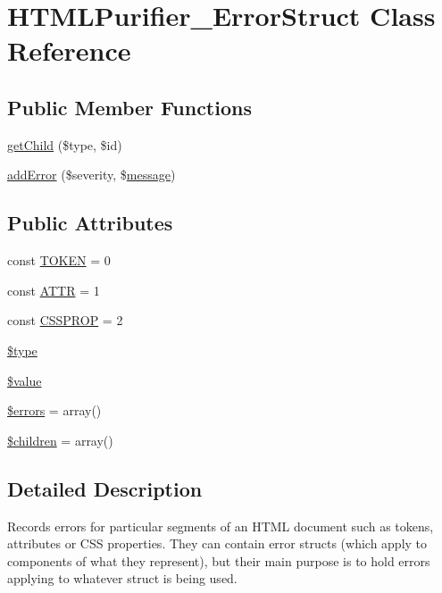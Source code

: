 \hypertarget{classHTMLPurifier__ErrorStruct}{\section{H\+T\+M\+L\+Purifier\+\_\+\+Error\+Struct Class Reference}
\label{classHTMLPurifier__ErrorStruct}
}
\subsection*{Public Member Functions}
\begin{DoxyCompactItemize}
\item 
\hyperlink{classHTMLPurifier__ErrorStruct_a027aefa6fd99d3e842e78b6a69e95136}{get\+Child} (\$type, \$id)
\item 
\hyperlink{classHTMLPurifier__ErrorStruct_a1f2e1f020e133f7df3dc4a38f0a63a1d}{add\+Error} (\$severity, \$\hyperlink{classmessage}{message})
\end{DoxyCompactItemize}
\subsection*{Public Attributes}
\begin{DoxyCompactItemize}
\item 
const \hyperlink{classHTMLPurifier__ErrorStruct_a50a2f9b5eb12a953ab5d37baa2928733}{T\+O\+K\+E\+N} = 0
\item 
const \hyperlink{classHTMLPurifier__ErrorStruct_ac827cd11b6e14c916bab544fa5cb1a8e}{A\+T\+T\+R} = 1
\item 
const \hyperlink{classHTMLPurifier__ErrorStruct_affa564239eb2648a565c7fe7efe108e2}{C\+S\+S\+P\+R\+O\+P} = 2
\item 
\hyperlink{classHTMLPurifier__ErrorStruct_ab0df20e74f43d79b9b5fc220b3db5ab6}{\$type}
\item 
\hyperlink{classHTMLPurifier__ErrorStruct_a1c8bc4d3501b43b91cfd02e8d425a5c3}{\$value}
\item 
\hyperlink{classHTMLPurifier__ErrorStruct_a370433ac100a38c2da678c5c787554e1}{\$errors} = array()
\item 
\hyperlink{classHTMLPurifier__ErrorStruct_a6d353ce9c9ce6e7d80e8f69dcf4f939f}{\$children} = array()
\end{DoxyCompactItemize}


\subsection{Detailed Description}
Records errors for particular segments of an H\+T\+M\+L document such as tokens, attributes or C\+S\+S properties. They can contain error structs (which apply to components of what they represent), but their main purpose is to hold errors applying to whatever struct is being used. 

